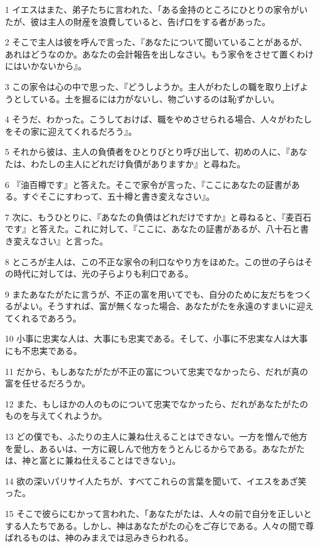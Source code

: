 \par 1 イエスはまた、弟子たちに言われた、「ある金持のところにひとりの家令がいたが、彼は主人の財産を浪費していると、告げ口をする者があった。
\par 2 そこで主人は彼を呼んで言った、『あなたについて聞いていることがあるが、あれはどうなのか。あなたの会計報告を出しなさい。もう家令をさせて置くわけにはいかないから』。
\par 3 この家令は心の中で思った、『どうしようか。主人がわたしの職を取り上げようとしている。土を掘るには力がないし、物ごいするのは恥ずかしい。
\par 4 そうだ、わかった。こうしておけば、職をやめさせられる場合、人々がわたしをその家に迎えてくれるだろう』。
\par 5 それから彼は、主人の負債者をひとりびとり呼び出して、初めの人に、『あなたは、わたしの主人にどれだけ負債がありますか』と尋ねた。
\par 6 『油百樽です』と答えた。そこで家令が言った、『ここにあなたの証書がある。すぐそこにすわって、五十樽と書き変えなさい』。
\par 7 次に、もうひとりに、『あなたの負債はどれだけですか』と尋ねると、『麦百石です』と答えた。これに対して、『ここに、あなたの証書があるが、八十石と書き変えなさい』と言った。
\par 8 ところが主人は、この不正な家令の利口なやり方をほめた。この世の子らはその時代に対しては、光の子らよりも利口である。
\par 9 またあなたがたに言うが、不正の富を用いてでも、自分のために友だちをつくるがよい。そうすれば、富が無くなった場合、あなたがたを永遠のすまいに迎えてくれるであろう。
\par 10 小事に忠実な人は、大事にも忠実である。そして、小事に不忠実な人は大事にも不忠実である。
\par 11 だから、もしあなたがたが不正の富について忠実でなかったら、だれが真の富を任せるだろうか。
\par 12 また、もしほかの人のものについて忠実でなかったら、だれがあなたがたのものを与えてくれようか。
\par 13 どの僕でも、ふたりの主人に兼ね仕えることはできない。一方を憎んで他方を愛し、あるいは、一方に親しんで他方をうとんじるからである。あなたがたは、神と富とに兼ね仕えることはできない」。
\par 14 欲の深いパリサイ人たちが、すべてこれらの言葉を聞いて、イエスをあざ笑った。
\par 15 そこで彼らにむかって言われた、「あなたがたは、人々の前で自分を正しいとする人たちである。しかし、神はあなたがたの心をご存じである。人々の間で尊ばれるものは、神のみまえでは忌みきらわれる。

